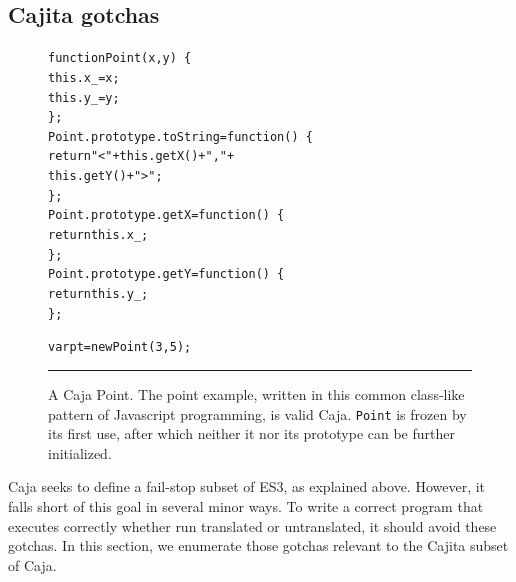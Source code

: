 \documentclass[letterpaper,twocolumn,10pt]{article}
\newcommand{\code}[1]{{\tt {#1}}}              %
\begin{document}
\subsection{Cajita gotchas}

\begin{figure}[t!]
\begin{alltt}
function Point(x, y)\ \{
  this.x\_ = x;
  this.y\_ = y;
\};
Point.prototype.toString = function()\ \{ 
  return "<" + this.getX() + "," + 
               this.getY() + ">"; 
\};
Point.prototype.getX = function()\ \{ 
  return this.x\_; 
\};
Point.prototype.getY = function()\ \{ 
  return this.y\_; 
\};

var pt = new Point(3, 5);
\end{alltt}

\caption[A Caja Point.]{A Caja Point. The point example, written
in this common class-like pattern of Javascript programming, is valid Caja.
\code{Point} is frozen by its first use, after which neither it nor its
prototype can be further initialized. \\ } \hrule
\label{fig:caja-point}
\end{figure}


Caja seeks to define a fail-stop subset of ES3, as explained above. However, 
it falls short of this goal in several minor ways. To write a correct program 
that executes correctly whether run translated or untranslated, it should 
avoid these gotchas. In this section, we enumerate those gotchas relevant to 
the Cajita subset of Caja.
\end{document}
